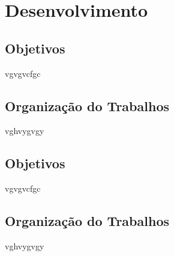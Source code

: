 \chapter{Desenvolvimento}



\section{Objetivos}

vgvgvcfgc

\section{Organização do Trabalhos}

 vghvygvgy



\section{Objetivos}

vgvgvcfgc

\section{Organização do Trabalhos}

 vghvygvgy